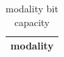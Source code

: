 \begin{table}[h]
\centering
\begin{tabular}{|c|}
\hline
modality \\ \hline
\hline
\end{tabular}
\caption{modality bit capacity}
\label{tab:T13}
\end{table}
